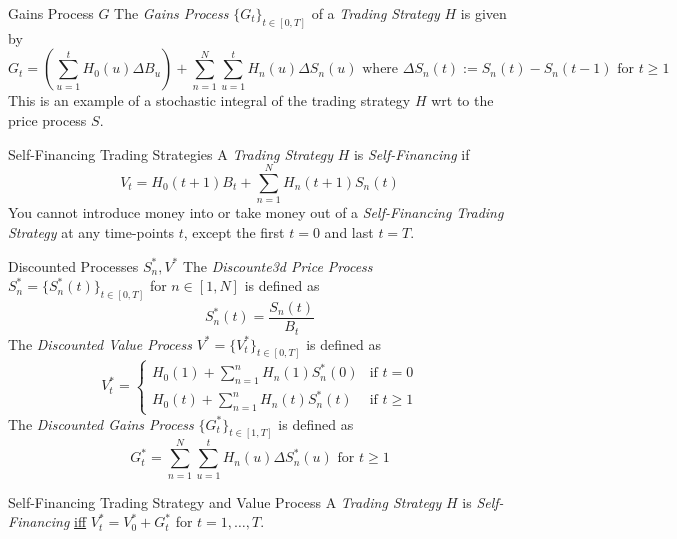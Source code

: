 \documentclass[11pt,a4paper]{article}
\begin{document}
  \begin{definition}{Gains Process $G$}
    The \textit{Gains Process} $\{G_t\}_{t\in[0,T]}$ of a \textit{Trading Strategy} $H$ is given by
    \[ G_t=\left(\sum_{u=1}^tH_0(u)\Delta B_u\right)+\sum_{n=1}^N\sum_{u=1}^tH_n(u)\Delta S_n(u)\text{ where }\Delta S_n(t):=S_n(t)-S_n(t-1)\text{ for }t\geq1 \]
    This is an example of a stochastic integral of the trading strategy $H$ wrt to the price process $S$.
  \end{definition}

  \begin{definition}{Self-Financing Trading Strategies}
    A \textit{Trading Strategy} $H$ is \textit{Self-Financing} if
    \[ V_t=H_0(t+1)B_t+\sum_{n=1}^NH_n(t+1)S_n(t) \]
    You cannot introduce money into or take money out of a \textit{Self-Financing Trading Strategy} at any time-points $t$, except the first $t=0$ and last $t=T$.
  \end{definition}

  \begin{definition}{Discounted Processes $S_n^*,V^*$}
    The \textit{Discounte3d Price Process} $S_n^*=\{S_n^*(t)\}_{t\in[0,T]}$ for $n\in[1,N]$ is defined as
    \[ S_n^*(t)=\frac{S_n(t)}{B_t} \]
    The \textit{Discounted Value Process} $V^*=\{V_t^*\}_{t\in[0,T]}$ is defined as
    \[ V_t^*=\begin{cases}
      H_0(1)+\sum_{n=1}^nH_n(1)S_n^*(0)&\text{if }t=0\\
      H_0(t)+\sum_{n=1}^nH_n(t)S_n^*(t)&\text{if }t\geq1
    \end{cases} \]
    The \textit{Discounted Gains Process} $\{G_t^*\}_{t\in[1,T]}$ is defined as
    \[ G_t^*=\sum_{n=1}^N\sum_{u=1}^tH_n(u)\Delta S_n^*(u)\text{ for }t\geq1 \]
  \end{definition}

  \begin{proposition}{Self-Financing Trading Strategy and Value Process}\label{the_self_financing_and_value_process}
    A \textit{Trading Strategy} $H$ is \textit{Self-Financing} \underline{iff} $V_t^*=V_0^*+G_t^*$ for $t=1,\dots,T$.
  \end{proposition}
\end{document}
